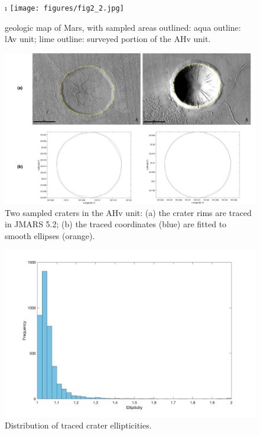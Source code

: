 \documentclass{ucetd}
\begin{document}
\begin{figure}
    \i
    \texttt{[image: figures/fig2\_2.jpg]}
    \caption[\citet{tanaka2014a} geologic map of Mars, with sampled areas outlined]{\citet{tanaka2014a} geologic map of Mars, with sampled areas outlined: aqua outline: lAv unit; lime outline: surveyed portion of the AHv unit.}
    \label{fig:2-2}
\end{figure}

\begin{figure}
    \centering
    \includegraphics[width=\textwidth]{figures/fig2_3.png}
    \caption[Two sampled craters in the AHv unit]{Two sampled craters in the AHv unit: (a) the crater rims are traced in JMARS 5.2; (b) the traced coordinates (blue) are fitted to smooth ellipses (orange).}
    \label{fig:2-3}
\end{figure}

\begin{figure}
    \centering
    \includegraphics[width=\textwidth]{figures/fig2_4.png}
    \caption[Distribution of traced crater ellipticities]{Distribution of traced crater ellipticities.}
    \label{fig:2-4}
\end{figure}
\end{document}

